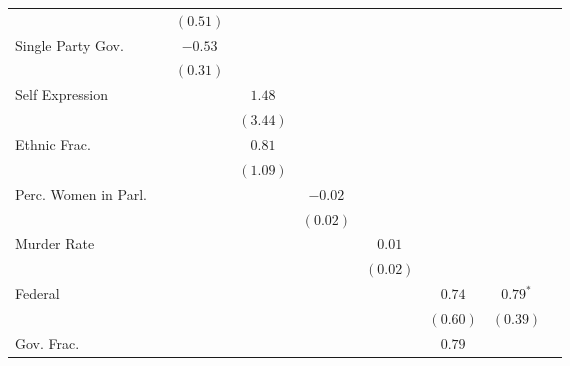 \documentclass[a4paper]{article}\usepackage[]{graphicx}\usepackage[]{color}
\begin{document}
\begin{table}
\begin{center}
{\begin{tabular}{l c c c c c c c c }
                        &               & $(0.51)$      &               &              &              &              &               &              \\
Single Party Gov.       &               & $-0.53$       &               &              &              &              &               &              \\
                        &               & $(0.31)$      &               &              &              &              &               &              \\
Self Expression         &               &               & $1.48$        &              &              &              &               &              \\
                        &               &               & $(3.44)$      &              &              &              &               &              \\
Ethnic Frac.            &               &               & $0.81$        &              &              &              &               &              \\
                        &               &               & $(1.09)$      &              &              &              &               &              \\
Perc. Women in Parl.    &               &               &               & $-0.02$      &              &              &               &              \\
                        &               &               &               & $(0.02)$     &              &              &               &              \\
Murder Rate             &               &               &               &              & $0.01$       &              &               &              \\
                        &               &               &               &              & $(0.02)$     &              &               &              \\
Federal                 &               &               &               &              &              & $0.74$       & $0.79^{*}$    &              \\
                        &               &               &               &              &              & $(0.60)$     & $(0.39)$      &              \\
Gov. Frac.              &               &               &               &              &              & $0.79$       &               &              \\

\end{tabular}}
\end{center}
\end{table}
\end{document}
